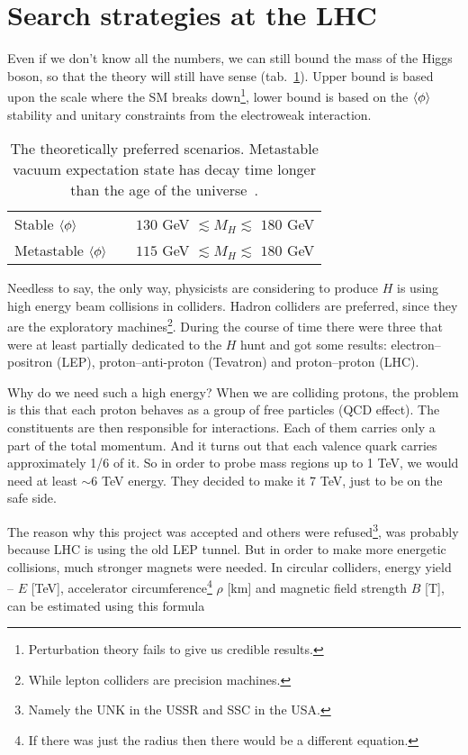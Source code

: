 \section{Search strategies at the LHC}

Even if we don't know all the numbers, we can still bound the mass of the Higgs boson, so that the theory will still have
sense (tab.~\ref{tab:vacuum:scenarios}). Upper bound is based upon the scale where the SM breaks down\footnote{Perturbation theory
fails to give us credible results.}, lower bound is based on the $\langle\phi\rangle$ stability and unitary constraints from the
electroweak interaction.

\begin{table}[H]
	\centering
	\caption{The theoretically preferred scenarios. Metastable vacuum expectation state has decay time
		longer than the age of the universe~\cite[pg.~5]{higgs:review}.}
	\begin{tabular}{l c r}
		\hline
		Stable $\langle\phi\rangle$ & \hspace{2cm} & {\color{BrickRed}$130$ GeV} $\lesssim M_H \lesssim$ $180$ GeV \\
		Metastable $\langle\phi\rangle$ & \hspace{2cm} & {\color{Green} $115$ GeV} $\lesssim M_H \lesssim$ $180$ GeV \\
		\hline
	\end{tabular}
	\label{tab:vacuum:scenarios}
\end{table}

Needless to say, the only way, physicists are considering to produce $H$ is using high energy beam collisions in colliders.
Hadron colliders are preferred, since they are the exploratory machines\footnote{While lepton colliders are precision machines.}.
During the course of time there were three that were at least partially dedicated to the $H$ hunt and got some results:
electron--positron (LEP), proton--anti-proton (Tevatron) and proton--proton (LHC).

Why do we need such a high energy? When we are colliding protons, the problem is this that each proton behaves as a group of
free particles (QCD effect). The constituents are then responsible for interactions. Each of them carries only a part of the
total momentum. And it turns out that each valence quark carries approximately 1/6 of it. So in order to probe mass regions up
to 1 TeV, we would need at least $\sim 6$ TeV energy. They decided to make it 7 TeV, just to be on the safe side.

The reason why this project was accepted and others were refused\footnote{Namely the UNK in the USSR and SSC in the USA.}, was
probably because LHC is using the old LEP tunnel. But in order to make more energetic collisions, much stronger magnets were needed.
In circular colliders, energy yield -- $E$ [TeV], accelerator circumference\footnote{If there was just the radius then there would be a different equation.}
$\rho$ [km] and magnetic field strength $B$ [T], can be estimated using this formula

